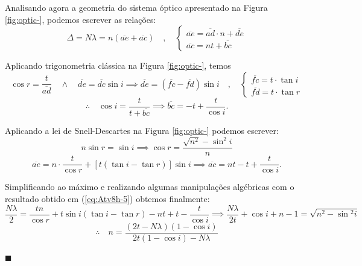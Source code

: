 \documentclass[12pt,a4paper]{article}
\begin{document}
\begin{enumerate}[label = \alph*)]
    Analisando agora a geometria do sistema óptico apresentado na Figura \ref{fig:optic-}, podemos escrever as relações:
    \begin{equation}\label{eq:Atv8h-3}
        \Delta=N\lambda=n\left(\overline{ae}+\overline{ac}\right)\quad,\quad
        \begin{cases}
            \overline{ae}=\overline{ad}\cdot n+\overline{de} \\
            \overline{ac}=nt+\overline{bc}
        \end{cases}
    \end{equation}

    Aplicando trigonometria clássica na Figura \ref{fig:optic-}, temos
    \begin{equation*}
        \cos{r}=\frac{t}{\overline{ad}}\quad\wedge\quad\overline{de}=\overline{dc}\sin{i}\implies\overline{de}=\left(\overline{fc}-\overline{fd}\right)\sin{i}\quad,\quad
        \begin{cases}
            \overline{fc}=t\cdot\tan{i} \\
            \overline{fd}=t\cdot\tan{r}
        \end{cases}
    \end{equation*}
    \begin{equation}\label{eq:Atv8h-4}
        \therefore\quad\cos{i}=\frac{t}{t+\overline{bc}}\implies\overline{bc}=-t+\frac{t}{\cos{i}}.
    \end{equation}

    Aplicando a lei de Snell-Descartes na Figura \ref{fig:optic-} podemos escrever:
    \begin{equation*}
        n\sin{r}=\sin{i}\implies\cos{r}=\frac{\sqrt{n^2}-\sin^2{i}}{n}
    \end{equation*}
    \begin{equation}\label{eq:Atv8h-5}
        \overline{ae}=n\cdot\frac{t}{\cos{r}}+\left[t\left(\tan{i}-\tan{r}\right)\right]\sin{i}\implies\overline{ac}=nt-t+\frac{t}{\cos{i}}.
    \end{equation}

    Simplificando ao máximo e realizando algumas manipulações algébricas com o resultado obtido em (\ref{eq:Atv8h-5}) obtemos finalmente:
    \begin{equation*}
        \frac{N\lambda}{2}=\frac{tn}{\cos{r}}+t\sin{i}\left(\tan{i}-\tan{r}\right)-nt+t-\frac{t}{\cos{i}}\implies\frac{N\lambda}{2t}+\cos{i}+n-1=\sqrt{n^2-\sin{^2i}}
    \end{equation*}
    \begin{equation}\label{eq:Atv8h-6}
        \therefore\quad\boxed{n=\frac{\left(2t-N\lambda\right)\left(1-\cos{i}\right)}{2t\left(1-\cos{i}\right)-N\lambda}}
    \end{equation}
    \begin{flushright}
        $\blacksquare$
    \end{flushright}
    
\end{enumerate}
\end{document}
